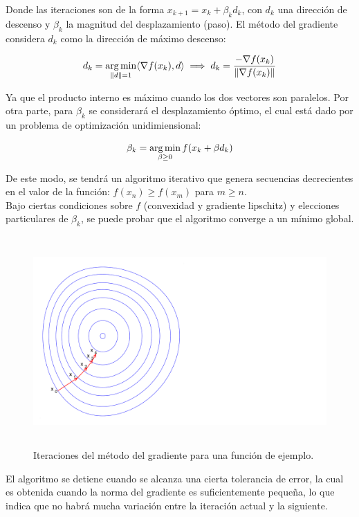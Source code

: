 Donde las iteraciones son de la forma $x_{k+1} = x_k + \beta_k d_k$, con $d_k$ una dirección de descenso y $\beta_k$ la magnitud del desplazamiento (paso). El método del gradiente considera $d_k$ como la dirección de máximo descenso:

\begin{equation}
	d_k = \operatorname*{arg\,min}_{\left\lVert d\right\rVert = 1} \langle\nabla f(x_k),d\rangle \implies d_k = \frac{-\nabla f(x_k)}{\left\lVert\nabla f(x_k)\right\rVert}
\end{equation}

Ya que el producto interno es máximo cuando los dos vectores son paralelos. Por otra parte, para $\beta_k$ se considerará el desplazamiento óptimo, el cual está dado por un problema de optimización unidimiensional:

\begin{equation}
	\beta_k = \operatorname*{arg\,min}_{\beta\geq 0} f(x_k + \beta d_k) 
\end{equation}

De este modo, se tendrá un algoritmo iterativo que genera secuencias decrecientes en el valor de la función: $f(x_n)\geq f(x_m)$ para $m\geq n$.\\

Bajo ciertas condiciones sobre $f$ (convexidad y gradiente lipschitz) y elecciones particulares de $\beta_k$, se puede probar que el algoritmo converge a un mínimo global. \\

\begin{figure}[h]
  \centering
  \includegraphics[width=12cm, height=8cm]{img/anexos_gd.pdf}
  \caption{Iteraciones del método del gradiente para una función de ejemplo.}
\end{figure}

El algoritmo se detiene cuando se alcanza una cierta tolerancia de error, la cual es obtenida cuando la norma del gradiente es suficientemente pequeña, lo que indica que no habrá mucha variación entre la iteración actual y la siguiente.

